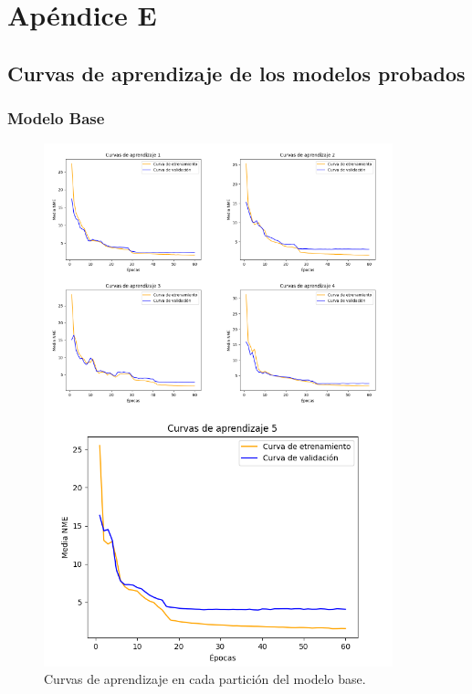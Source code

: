 
\chapter{Apéndice E}\label{ap:apendiceD}

\section*{Curvas de aprendizaje de los modelos probados}

\subsection*{Modelo Base}
\begin{figure}[H]
    \centering
    \includegraphics[width=0.9\textwidth]{img/curvas_aprendizaje_modelbase.png}
    \caption{Curvas de aprendizaje en cada partición del modelo base.}
    \label{fig:Curvas_modelbase}
\end{figure}

